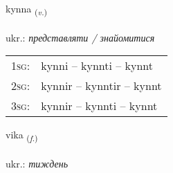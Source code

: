 \documentclass[frontgrid, backgrid]{flacards}\usepackage[]{graphicx}\usepackage[]{xcolor}
\begin{document}
\renewcommand{\flhead}{\vskip5pt \fboxsep=0pt {\small\bfseries\footnotesize Sagnorð | дієслово}}
\renewcommand{\fcfoot}{\vskip5pt \fboxsep=0pt \hspace{2pt}{\small\bfseries\footnotesize 1K}}

\renewcommand{\blhead}{\vskip5pt {\small\bfseries\footnotesize Sagnorð | дієслово }}
\renewcommand{\bcfoot}{\vskip5pt \hspace{2pt}{\small\bfseries\footnotesize 1K}}


{kynna \small{\textsubscript{(\textit{v.})}} \\[1ex] %
\textphonetic{[cʰɪna]} \\
ukr.: \emph{представляти / знайомитися} \\  [2ex]
\renewcommand*{\arraystretch}{0.8}
\begin{tabular}{p{1cm}l}
\textsc{1sg}: & kynni -- kynnti -- kynnt \\ 
\textsc{2sg}: & kynnir -- kynntir -- kynnt \\ 
\textsc{3sg}: & kynnir -- kynnti -- kynnt \\ 
\end{tabular}
}

\renewcommand{\flhead}{\vskip5pt \fboxsep=0pt {\small\bfseries\footnotesize Nafnorð | іменник}}
\renewcommand{\fcfoot}{\vskip5pt \fboxsep=0pt \hspace{2pt}{\small\bfseries\footnotesize 1K}}

\renewcommand{\blhead}{\vskip5pt {\small\bfseries\footnotesize Nafnorð | іменник }}
\renewcommand{\bcfoot}{\vskip5pt \hspace{2pt}{\small\bfseries\footnotesize 1K}}


{vika \small{\textsubscript{(\textit{f.})}} \\[1ex] %
\textphonetic{[vɪːka]} \\
ukr.: \emph{тиждень} \\  [2ex]
\renewcommand*{\arraystretch}{0.8}
}
\end{document}
